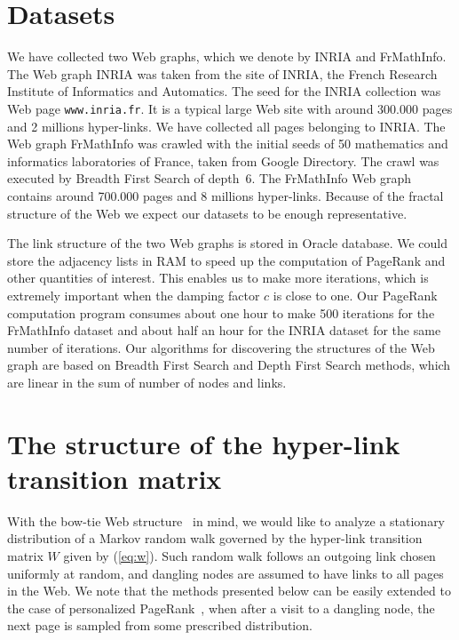 \documentclass{article}
\begin{document}
\section{Datasets}
\label{sec:datasets}

We have collected two Web graphs, which we denote by INRIA and
FrMathInfo. The Web graph INRIA was taken from the site of INRIA,
the French Research Institute of Informatics and Automatics. The
seed for the INRIA collection was Web page {\tt www.inria.fr}. It is
a typical large Web site with around 300.000 pages and 2 millions
hyper-links. We have collected all pages belonging to INRIA. The Web
graph FrMathInfo was crawled with the initial seeds of 50
mathematics and informatics laboratories of France, taken from
Google Directory. The crawl was executed by Breadth First Search of
depth~6. The FrMathInfo Web graph contains around 700.000 pages and
8 millions hyper-links. Because of the fractal structure of the Web
\cite{Dill02} we expect our datasets to be enough representative.

The link structure of the two Web graphs is stored in Oracle
database. We could store the adjacency lists in RAM to speed up the
computation of PageRank and other quantities of interest. This
enables us to make more iterations, which is extremely important
when the damping factor $c$ is close to one. Our PageRank
computation program consumes about one hour to make 500 iterations
for the FrMathInfo dataset and about half an hour for the INRIA
dataset for the same number of iterations. Our algorithms for
discovering the structures of the Web graph are based on Breadth
First Search and Depth First Search methods, which are linear in the
sum of number of nodes and links.


\section{The structure of the hyper-link transition matrix}
\label{sec:ergodic}

With the bow-tie Web structure~\cite{Broder00,Kumar00} in mind, we
would like to analyze a stationary distribution of a Markov random
walk governed by the hyper-link transition matrix $W$ given by
(\ref{eq:w}). Such random walk follows an outgoing link chosen
uniformly at random, and dangling nodes are assumed to have links to
all pages in the Web. We note that the methods presented below can
be easily extended to the case of personalized
PageRank~\cite{Haveliwala03}, when after a visit to a dangling node,
the next page is sampled from some prescribed distribution.
\end{document}
